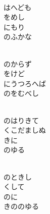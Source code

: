 \documentclass[10pt,b5j]{tarticle} %
\begin{document}
\vspace{1.5em} %
\newcommand{\linespace}{0.5em} %
\newcommand{\blocksize}{0.5\hsize} %
\newcommand{\itemmargin}{6em} %
\begin{enumerate} %
    \setlength{\itemindent}{\itemmargin} %
    \begin{minipage}[c]{\blocksize}
    
        \vspace{\linespace}
        \item~\\
        はへども\\
        をめし\\
        にもり\\
        のふかな
        
        \vspace{\linespace}
        \item~\\
        のからず\\
        をけど\\
        にうつろへば\\
        のをむべし
        
        \vspace{\linespace}
        \item~\\
        のはりきて\\
        くこだましぬ\\
        きに\\
        のゆる
        
        \vspace{\linespace}
        \item~\\
        のときし\\
        くして\\
        のに\\
        きののゆる
        

\end{minipage}
\end{enumerate}
\end{document}
